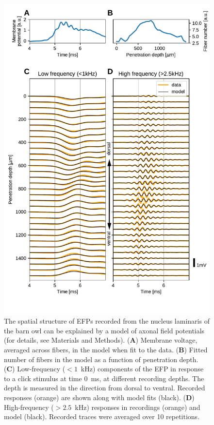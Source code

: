 \documentclass[]{elife}
\begin{document}
\begin{figure}[htbp]
\centering
\includegraphics[height=0.65\vsize]{figs/fig_5.pdf}
\caption{\label{fig:barnowl}The spatial structure of EFPs recorded from
the nucleus laminaris of the barn owl can be explained by a model of
axonal field potentials (for details, see Materials and Methods).
(\textbf{A}) Membrane voltage, averaged across fibers, in the model when
fit to the data. (\textbf{B}) Fitted number of fibers in the model as a
function of penetration depth. (\textbf{C}) Low-frequency ($< 1$~kHz)
components of the EFP in response to a click stimulus at time 0~ms, at
different recording depths. The depth is measured in the direction from
dorsal to ventral. Recorded responses (orange) are shown along with
model fits (black). (\textbf{D}) High-frequency ($> 2.5$~kHz)
responses in recordings (orange) and model (black). Recorded traces were
averaged over 10 repetitions.}
\end{figure}
\end{document}
